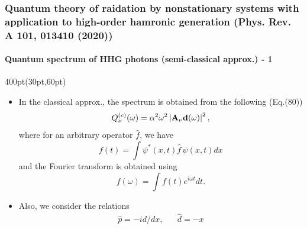 \begin{frame}
\frametitle{Quantum theory of raidation by nonstationary systems 
	with application to high-order hamronic generation
        (Phys. Rev. A 101, 013410 (2020))}
	\framesubtitle{Quantum spectrum of HHG photons (semi-classical approx.) - 1}

\begin{textblock*}{400pt}(30pt,60pt)
\footnotesize
\begin{itemize}
\item In the classical approx., the spectrum is obtained from the following 
(Eq.(80))
\begin{equation}
Q^{(c)}_\nu (\omega) = 
 \alpha^2 \omega^2
    \left| \boldsymbol{\rm A}_{\nu}\boldsymbol{\rm d}(\omega) \right|^2,
\label{eqn:Qc}
\end{equation}
where for an arbitrary operator $\hat{f}$, we have   
\begin{equation}
f(t) = \int \psi^{*}(x,t)\hat{f}\,\psi(x,t)dx
\label{eqn:mean_value}
\end{equation}
and the Fourier transform is obtained using 
\begin{equation}
f(\omega) = \int f(t)e^{i\omega t}dt.
\label{eqn:fourier}
\end{equation}

\item Also, we consider the relations
\begin{align}
 \hat{p} = -i d/dx, \hspace{20pt} \hat{d} = -x
\end{align}
\end{itemize}
\end{textblock*}


\end{frame}






